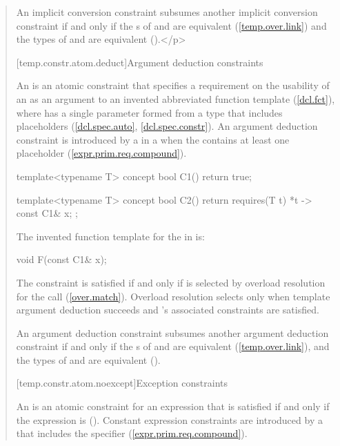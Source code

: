 \begin{quote}
\pnum
An implicit conversion constraint  subsumes another implicit 
conversion constraint  if and only if the s 
of  and  are equivalent (\ref{temp.over.link}) and the types
of  and  are equivalent ().</p>


[temp.constr.atom.deduct]{Argument deduction constraints}

\pnum
An  is an atomic
constraint that specifies a requirement on 
the usability of an  
 as an argument to an invented abbreviated
function template  (\ref{dcl.fct}),
where  has a single parameter formed from a type that 
includes placeholders 
(\ref{dcl.spec.auto}, \ref{dcl.spec.constr}).
% 
\enternote
An argument deduction constraint is introduced by a
 in a
 when the
contains at least one placeholder
(\ref{expr.prim.req.compound}).
\exitnote
% 
\enterexample
\begin{codeblock}
template<typename T>
concept bool C1() { return true; }

template<typename T>
concept bool C2() { return requires(T t) { {*t} -> const C1& x; }; }
\end{codeblock}
The invented function template for the
 in
 is:
\begin{codeblock}
void F(const C1& x);
\end{codeblock}
\exitexample
% 
The constraint is satisfied if and only if 
is selected by overload resolution for the call 
(\ref{over.match}).
% 
\enternote
Overload resolution selects  only when template 
argument deduction succeeds and 's associated 
constraints are satisfied.
\exitnote

\pnum
An argument deduction constraint  subsumes another argument deduction 
constraint  if and only if the s of
 and  are equivalent (\ref{temp.over.link}), and the types
of  and  are equivalent (). 


[temp.constr.atom.noexcept]{Exception constraints}

\pnum
An  is an atomic constraint
for an expression  that is satisfied if and only
if the expression  is 
().
% 
\enternote
Constant expression constraints are introduced by a
 that
includes the  specifier
(\ref{expr.prim.req.compound}).
\exitnote



\end{quote}
